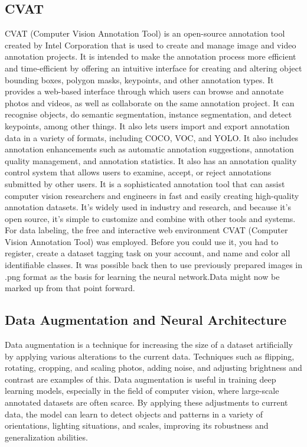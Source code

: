 \documentclass[11pt, a4paper, openany]{book}
\begin{document}
\subsection{CVAT}
CVAT (Computer Vision Annotation Tool) is an open-source annotation tool created by Intel Corporation that is used to create and manage image and video annotation projects. It is intended to make the annotation process more efficient and time-efficient by offering an intuitive interface for creating and altering object bounding boxes, polygon masks, keypoints, and other annotation types.
\newline
It provides a web-based interface through which users can browse and annotate photos and videos, as well as collaborate on the same annotation project. It can recognise objects, do semantic segmentation, instance segmentation, and detect keypoints, among other things. It also lets users import and export annotation data in a variety of formats, including COCO, VOC, and YOLO.
\newline
It also includes annotation enhancements such as automatic annotation suggestions, annotation quality management, and annotation statistics. It also has an annotation quality control system that allows users to examine, accept, or reject annotations submitted by other users.
\newline
It is a sophisticated annotation tool that can assist computer vision researchers and engineers in fast and easily creating high-quality annotation datasets. It's widely used in industry and research, and because it's open source, it's simple to customize and combine with other tools and systems.
For data labeling, the free and interactive web environment CVAT (Computer Vision Annotation Tool) was employed. Before you could use it, you had to register, create a dataset tagging task on your account, and name and color all identifiable classes. It was possible back then to use previously prepared images in .png format as the basis for learning the neural network.Data might now be marked up from that point forward. 



\subsection{Data Augmentation and Neural Architecture}
Data augmentation is a technique for increasing the size of a dataset artificially by applying various alterations to the current data. Techniques such as flipping, rotating, cropping, and scaling photos, adding noise, and adjusting brightness and contrast are examples of this. Data augmentation is useful in training deep learning models, especially in the field of computer vision, where large-scale annotated datasets are often scarce. By applying these adjustments to current data, the model can learn to detect objects and patterns in a variety of orientations, lighting situations, and scales, improving its robustness and generalization abilities.
\end{document}

